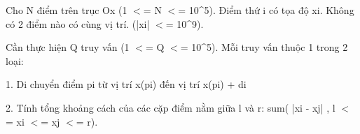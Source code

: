 Cho N điểm trên trục Ox (1 $<$= N $<$= 10\textasciicircum5). Điểm thứ i có tọa độ xi. Không có 2 điểm nào có cùng vị trí. (|xi| $<$= 10\textasciicircum9).

Cần thực hiện Q truy vấn (1 $<$= Q $<$= 10\textasciicircum5). Mỗi truy vấn thuộc 1 trong 2 loại:

1. Di chuyển điểm pi từ vị trí x(pi) đến vị trí x(pi) + di

2. Tính tổng khoảng cách của các cặp điểm nằm giữa l và r: sum( |xi - xj| , l $<$= xi $<$= xj $<$= r).